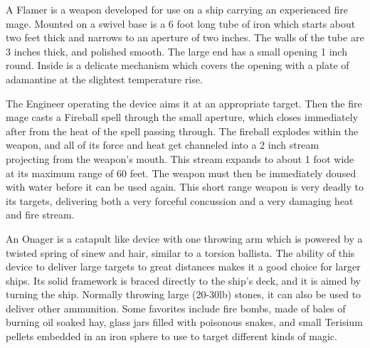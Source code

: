 A Flamer is a weapon developed for use on a ship carrying an experienced fire mage. Mounted on a swivel base is a 6 foot long tube of iron which starts about two feet thick and narrows to an aperture of two inches. The walls of the tube are 3 inches thick, and polished smooth. The large end has a small opening 1 inch round. Inside is a delicate mechanism which covers the opening with a plate of adamantine at the slightest temperature rise.

The Engineer operating the device aims it at an appropriate target. Then the fire mage casts a Fireball spell through the small aperture, which closes immediately after from the heat of the spell passing through. The fireball explodes within the weapon, and all of its force and heat get channeled into a 2 inch stream projecting from the weapon's mouth. This stream expands to about 1 foot wide at its maximum range of 60 feet. The weapon must then be immediately doused with water before it can be used again. This short range weapon is very deadly to its targets, delivering both a very forceful concussion and a very damaging heat and fire stream. 

An Onager is a catapult like device with one throwing arm which is powered by a twisted spring of sinew and hair, similar to a torsion ballista. The ability of this device to deliver large targets to great distances makes it a good choice for larger ships. Its solid framework is braced directly to the ship's deck, and it is aimed by turning the ship. Normally throwing large (20-30lb) stones, it can also be used
to deliver other ammunition. Some favorites include fire bombs, made of bales of burning oil soaked hay, glass jars filled with poisonous snakes, and small Terisium pellets embedded in an iron sphere to use to target different kinds of magic.

